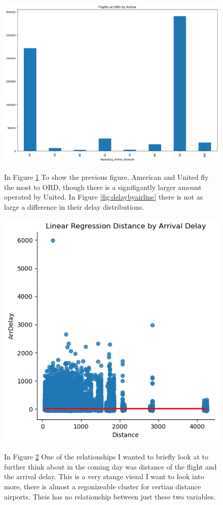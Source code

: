 \documentclass[a4paper,12pt]{article}
\begin{document}
\begin{figure}
    \centering
    \includegraphics*[scale=.40]{../../img/flights_by_airline.png}
    \caption[]{}
    \label{fig:flightsbyairline} 
    In Figure \ref{fig:flightsbyairline} To show the previous figure, American and United fly the most to ORD, though there is a signifigantly larger amount operated by United. In Figure \ref{fig:delaybyairline} 
    there is not as large a difference in their delay distributions.
\end{figure}

\begin{figure}
    \centering
    \includegraphics*[]{../../img/dist_by_delay.png}
    \caption[]{}
    \label{fig:lm_disbydelay}
    In Figure \ref{fig:lm_disbydelay} One of the relationships I wanted to briefly look at to further think about in the coming day was distance of the flight and the arrival delay.
    This is a very stange visual I want to look into more, there is almost a regonizeable cluster for certian distance airports. Theis has no relationship between just these two variables.
\end{figure}
\end{document}
